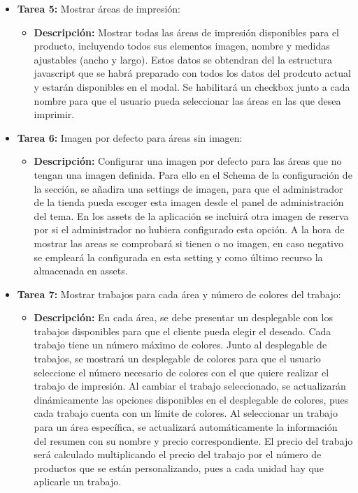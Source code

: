 \documentclass[12pt]{article}
\begin{document}
\begin{itemize}
\begin{itemize}[label=--]
          \end{itemize}
    \item \textbf{Tarea 5:} Mostrar áreas de impresión:
          \begin{itemize}[label=--]
              \item \textbf{Descripción:} Mostrar todas las áreas de impresión disponibles para el producto, incluyendo todos sus elementos imagen, nombre y medidas ajustables (ancho y largo). Estos datos se obtendran del la estructura javascript que se habrá preparado con todos los datos del prodcuto actual y estarán disponibles en el modal. Se habilitará un checkbox junto a cada nombre para que el usuario pueda seleccionar las áreas en las que desea imprimir.
          \end{itemize}
    \item \textbf{Tarea 6:} Imagen por defecto para áreas sin imagen:
          \begin{itemize}[label=--]
              \item \textbf{Descripción:} Configurar una imagen por defecto para las áreas que no tengan una imagen definida. Para ello en el Schema de la configuración de la sección, se añadira una settings de imagen, para que el administrador de la tienda pueda escoger esta imagen desde el panel de administración del tema. En los assets de la aplicación se incluirá otra imagen de reserva por si el administrador no hubiera configurado esta opción. A la hora de mostrar las areas se comprobará si tienen o no imagen, en caso negativo se empleará la configurada en esta setting y como último recurso la almacenada en assets.
          \end{itemize}
    \item \textbf{Tarea 7:} Mostrar trabajos para cada área y número de colores del trabajo:
          \begin{itemize}[label=--]
              \item \textbf{Descripción:} En cada área, se debe presentar un desplegable con los trabajos disponibles para que el cliente pueda elegir el deseado. Cada trabajo tiene un número máximo de colores. Junto al desplegable de trabajos, se mostrará un desplegable de colores para que el usuario seleccione el número necesario de colores con el que quiere realizar el trabajo de impresión. Al cambiar el trabajo seleccionado, se actualizarán dinámicamente las opciones disponibles en el desplegable de colores, pues cada trabajo cuenta con un límite de colores. Al seleccionar un trabajo para un área específica, se actualizará automáticamente la información del resumen con su nombre y precio correspondiente. El precio del trabajo será calculado multiplicando el precio del trabajo por el número de productos que se están personalizando, pues a cada unidad hay que aplicarle un trabajo.

\end{itemize}
\end{itemize}
\end{document}

